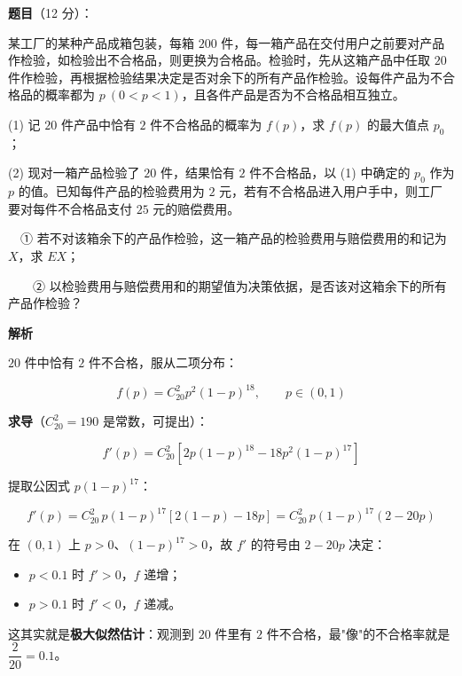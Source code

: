 \begin{answer}

\textbf{题目}（12 分）：

某工厂的某种产品成箱包装，每箱 $200$ 件，每一箱产品在交付用户之前要对产品作检验，如检验出不合格品，则更换为合格品。检验时，先从这箱产品中任取 $20$ 件作检验，再根据检验结果决定是否对余下的所有产品作检验。设每件产品为不合格品的概率都为 $p\ (0<p<1)$，且各件产品是否为不合格品相互独立。

  (1) 记 $20$ 件产品中恰有 $2$ 件不合格品的概率为 $f(p)$，求 $f(p)$ 的最大值点 $p_0$；

  (2) 现对一箱产品检验了 $20$ 件，结果恰有 $2$ 件不合格品，以 (1) 中确定的 $p_0$ 作为 $p$ 的值。已知每件产品的检验费用为 $2$ 元，若有不合格品进入用户手中，则工厂要对每件不合格品支付 $25$ 元的赔偿费用。

  　① 若不对该箱余下的产品作检验，这一箱产品的检验费用与赔偿费用的和记为 $X$，求 $EX$；

  　　② 以检验费用与赔偿费用和的期望值为决策依据，是否该对这箱余下的所有产品作检验？

\par\medskip

\Needspace{0.4\textheight}

\textbf{解析}


$20$ 件中恰有 $2$ 件不合格，服从二项分布：

\nopagebreak[4]
\[f(p)=C_{20}^{2}p^{2}(1-p)^{18},\qquad p\in(0,1)\]

\textbf{求导}（$C_{20}^{2}=190$ 是常数，可提出）：

\nopagebreak[4]
\[f'(p)=C_{20}^{2}\left[2p(1-p)^{18}-18p^{2}(1-p)^{17}\right]\]

提取公因式 $p(1-p)^{17}$：

\nopagebreak[4]
\[f'(p)=C_{20}^{2}\,p(1-p)^{17}\left[2(1-p)-18p\right]=C_{20}^{2}\,p(1-p)^{17}(2-20p)\]

在 $(0,1)$ 上 $p>0$、$(1-p)^{17}>0$，故 $f'$ 的符号由 $2-20p$ 决定：

\begin{itemize}
\item $p<0.1$ 时 $f'>0$，$f$ 递增；
\item $p>0.1$ 时 $f'<0$，$f$ 递减。
\end{itemize}

\begin{gktip}
这其实就是\textbf{极大似然估计}：观测到 $20$ 件里有 $2$ 件不合格，最"像"的不合格率就是 $\dfrac2{20}=0.1$。
\end{gktip}


\end{answer}
